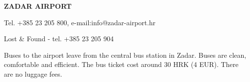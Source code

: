 \documentclass[12pt]{article}
\begin{document}
\vspace{1cm}
\noindent
\textbf{ZADAR AIRPORT}


\noindent
Tel. +385 23 205 800, e-mail:info@zadar-airport.hr

\noindent
Lost \& Found - tel. +385 23 205 904

\noindent
Buses to the airport leave from the central bus station in Zadar. Buses are clean, comfortable and efficient. The bus ticket cost around 30 HRK (4 EUR). There are no luggage fees.

\newpage
\end{document}
